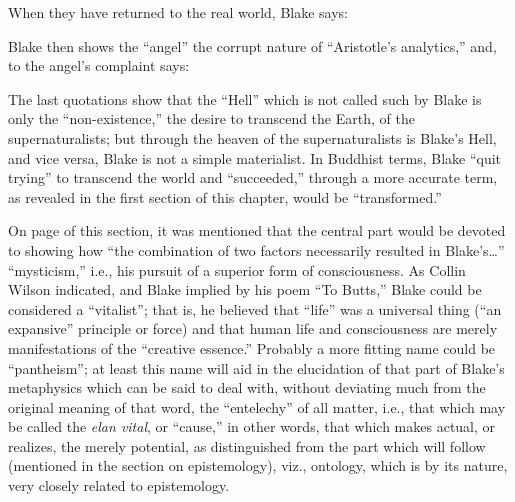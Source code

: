 When they have returned to the real world, Blake says:


Blake then shows the \enquote{angel} the corrupt nature of \enquote{Aristotle's analytics,} and, to the angel's complaint says:


The last quotations show that the \enquote{Hell} which is not called such by Blake is only the
\enquote{non-existence,} the desire to transcend the Earth, of the supernaturalists; but through the
heaven of the supernaturalists is Blake's Hell, and vice versa, Blake is not a simple materialist. In Buddhist terms,
Blake \enquote{quit trying} to transcend the world and \enquote{succeeded,} through a more accurate term,
as revealed in the first section of this chapter, would be \enquote{transformed.}

On page \pageref{self:24} of this section, it was mentioned that the central part would be devoted
to showing how \enquote{the combination of two factors necessarily resulted in Blake's\dots} \enquote{mysticism,} i.e., his
pursuit of a superior form of consciousness. As Collin Wilson indicated, and Blake implied by
his poem \enquote{To Butts,} Blake could be considered a \enquote{vitalist}; that is, he believed that \enquote{life} was a universal
thing (\enquote{an expansive} principle or force) and that human life and consciousness are merely
manifestations of the \enquote{creative essence.} Probably a more fitting name could be \enquote{pantheism}; at least
this name will aid in the elucidation of that part of Blake's metaphysics which can be said to deal with,
without deviating much from the original meaning of that word, the \enquote{entelechy} of all matter, i.e., that
which may be called the \emph{elan vital}, or \enquote{cause,} in other words, that which makes actual,
or realizes, the merely potential, as distinguished from the part which will follow (mentioned in the section on
epistemology), viz., ontology, which is by its nature, very closely related to epistemology.

